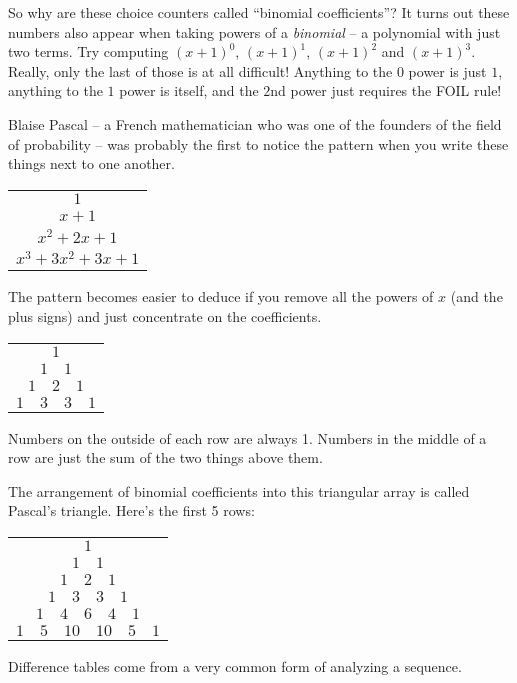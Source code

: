 So why are these choice counters called ``binomial coefficients''?   It turns out these numbers also appear when taking powers of a {\em binomial} -- a polynomial with just two terms.  Try computing $(x+1)^0$, $(x+1)^1$, $(x+1)^2$ and $(x+1)^3$.  Really, only the last of those is at all difficult!  Anything to the $0$ power is just $1$, anything to the $1$ power is itself, and the $2$nd power just requires the FOIL rule!

Blaise Pascal -- a French mathematician who was one of the founders of the field of probability -- was probably the first to notice the pattern when you write these things next to one another.


\begin{tabular}{c}
	$1$ \\
	$x+1$ \\
	$x^2+2x+1$ \\
	$x^3 + 3x^2 + 3x+1$\\
\end{tabular}

The pattern becomes easier to deduce if you remove all the powers of $x$ (and the plus signs) and just concentrate on the coefficients.

\begin{tabular}{c}
	$1$ \\
	$1 \quad 1$ \\
	$1 \quad 2 \quad 1$ \\
	$1 \quad 3 \quad 3 \quad 1$\\
\end{tabular}

 Numbers on the outside of each row are always 1.  Numbers in the middle of a row are just the sum of the two things above them.
 
 The arrangement of binomial coefficients into this triangular array is called Pascal's triangle.  Here's the first 5 rows:
 
 \begin{tabular}{c}
 	$1$ \\
 	$1 \quad 1$ \\
 	$1 \quad 2 \quad 1$ \\
 	$1 \quad 3 \quad 3 \quad 1$\\
 	$1 \quad 4 \quad 6 \quad 4 \quad 1$\\
 	$1 \quad 5 \quad 10 \quad 10 \quad 5 \quad 1$\\
 \end{tabular}
 
 Difference tables come from a very common form of analyzing a sequence.
 
